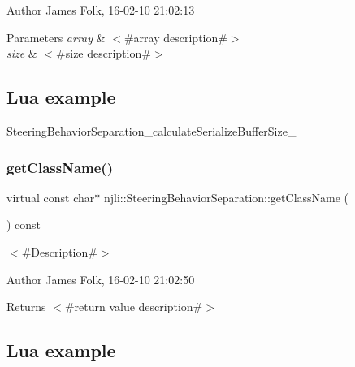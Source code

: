 \begin{DoxyAuthor}{Author}
James Folk, 16-\/02-\/10 21\+:02\+:13
\end{DoxyAuthor}

\begin{DoxyParams}{Parameters}
{\em array} & $<$\#array description\#$>$ \\
\hline
{\em size} & $<$\#size description\#$>$\\
\hline
\end{DoxyParams}
\hypertarget{classnjli_1_1_steering_behavior_wander_ex1}{}\subsection{Lua example}\label{classnjli_1_1_steering_behavior_wander_ex1}

\begin{DoxyCodeInclude}
\end{DoxyCodeInclude}
Steering\+Behavior\+Separation\+\_\+calculate\+Serialize\+Buffer\+Size\+\_\+ \mbox{\label{classnjli_1_1_steering_behavior_separation_a054f3b8439ed7b93dfa03f71310758ee}} 
\subsubsection{\texorpdfstring{get\+Class\+Name()}{getClassName()}}
{\footnotesize\ttfamily virtual const char$\ast$ njli\+::\+Steering\+Behavior\+Separation\+::get\+Class\+Name (\begin{DoxyParamCaption}{ }\end{DoxyParamCaption}) const\hspace{0.3cm}{\ttfamily [virtual]}}



$<$\#\+Description\#$>$ 

\begin{DoxyAuthor}{Author}
James Folk, 16-\/02-\/10 21\+:02\+:50
\end{DoxyAuthor}
\begin{DoxyReturn}{Returns}
$<$\#return value description\#$>$
\end{DoxyReturn}
\hypertarget{classnjli_1_1_steering_behavior_wander_ex1}{}\subsection{Lua example}\label{classnjli_1_1_steering_behavior_wander_ex1}

